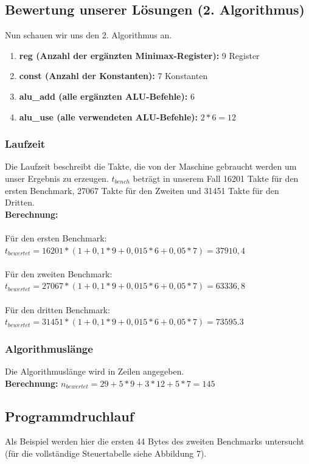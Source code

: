 \documentclass[12pt,titlepage]{article}
\begin{document}
\newpage

\subsection{Bewertung unserer Lösungen (2. Algorithmus)}

Nun schauen wir uns den 2. Algorithmus an.

\begin{enumerate}
\item \textbf{reg (Anzahl der ergänzten Minimax-Register): } 9 Register
\item \textbf{const (Anzahl der Konstanten): } 7 Konstanten
\item \textbf{alu\_add (alle erg{\"a}nzten ALU-Befehle):} 6
\item \textbf{alu\_use (alle verwendeten ALU-Befehle):} $2*6=12$
\end{enumerate}

\subsubsection{Laufzeit}
Die Laufzeit beschreibt die Takte, die von der Maschine gebraucht werden um unser Ergebnis zu erzeugen. $t_{bench}$ beträgt in unserem Fall 16201 Takte für den ersten Benchmark, 27067 Takte für den Zweiten und 31451 Takte für den Dritten.\\

\textbf{Berechnung:}\\\\
Für den ersten Benchmark: $t_{bewertet} = 16201 * (1 + 0,1*9 + 0,015*6 + 0,05 * 7) = 37910,4$\\\\
Für den zweiten Benchmark: $t_{bewertet} = 27067 * (1 + 0,1*9 + 0,015*6 + 0,05 * 7) = 63336,8$\\\\
Für den dritten Benchmark: $t_{bewertet} = 31451 * (1 + 0,1*9 + 0,015*6 + 0,05 * 7) = 73595.3$\\

\subsubsection{Algorithmuslänge}
Die Algorithmuslänge wird in Zeilen angegeben.\\

\textbf{Berechnung:} $n_{bewertet} = 29 + 5*9 + 3*12 + 5*7 = 145$


\newpage

\subsection{Programmdruchlauf}
Als Beispiel werden hier die ersten 44 Bytes des zweiten Benchmarks untersucht (für die vollständige Steuertabelle siehe Abbildung 7).
\end{document}
